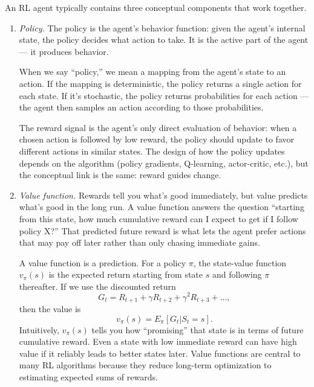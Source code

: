 An RL agent typically contains three conceptual components that work together.
\begin{enumerate}
    \item \textit{Policy.} The policy is the agent’s behavior function: given the agent’s internal state, the policy decides what action to take. It is the active part of the agent — it produces behavior.

    When we say “policy,” we mean a mapping from the agent’s state to an action. If the mapping is deterministic, the policy returns a single action for each state. If it’s stochastic, the policy returns probabilities for each action — the agent then samples an action according to those probabilities.

    The reward signal is the agent’s only direct evaluation of behavior: when a chosen action is followed by low reward, the policy should update to favor different actions in similar states. The design of how the policy updates depends on the algorithm (policy gradients, Q-learning, actor-critic, etc.), but the conceptual link is the same: reward guides change.
    
    \item \textit{Value function.} Rewards tell you what’s good immediately, but value predicts what’s good in the long run. A value function answers the question “starting from this state, how much cumulative reward can I expect to get if I follow policy X?” That predicted future reward is what lets the agent prefer actions that may pay off later rather than only chasing immediate gains.

    A value function is a prediction. For a policy $\pi$, the state-value function $v_\pi(s)$ is the expected return starting from state  $s$ and following $\pi$ thereafter. If we use the discounted return
    \begin{equation*}
        G_t=R_{t+1}+\gamma R_{t+2}+\gamma^2 R_{t+3}+\ldots,
    \end{equation*}
    then the value is
    \begin{equation*}
        v_\pi(s)=E_\pi[G_t|S_t=s].
    \end{equation*}
    Intuitively, $v_\pi(s)$ tells you how “promising” that state is in terms of future cumulative reward. Even a state with low immediate reward can have high value if it reliably leads to better states later. Value functions are central to many RL algorithms because they reduce long-term optimization to estimating expected sums of rewards.
    

\end{enumerate}
